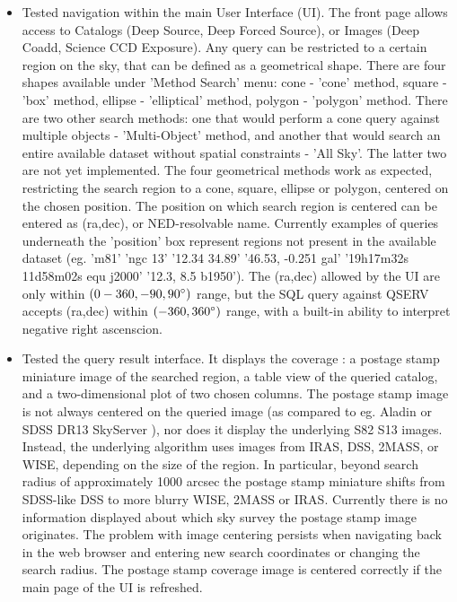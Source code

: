 \documentclass[DM,lsstdraft,toc,usenatbib]{lsstdoc}
\begin{document}
\begin{itemize}
	\item Tested navigation within the main User Interface (UI). The front page allows access to Catalogs (Deep Source, Deep Forced Source), or Images (Deep Coadd, Science CCD Exposure). Any query can be restricted to a certain region on the sky, that can be defined as a geometrical shape. There are four shapes available under  'Method Search' menu:  cone - 'cone' method,  square - 'box' method,  ellipse - 'elliptical' method, polygon - 'polygon' method.  There are two other search methods: one that would perform a cone query against multiple objects - 'Multi-Object' method, and  another  that would search an entire available dataset without spatial constraints  - 'All Sky'. The latter two are not yet implemented. The four geometrical methods work as expected, restricting the search region to a cone, square, ellipse or polygon, centered on the chosen position.  The position on which search region is centered can be entered as (ra,dec), or NED-resolvable name. Currently examples of queries underneath the 'position' box represent regions not present in the available dataset (eg. 'm81' 'ngc 13' '12.34 34.89' '46.53, -0.251 gal'  '19h17m32s 11d58m02s equ j2000' '12.3, 8.5 b1950'). The (ra,dec) allowed by the UI are only within  $(0-360, -90,90 \degree)$ range, but the SQL query against QSERV  accepts (ra,dec) within $(-360,360 \degree)$ range, with a built-in ability to interpret negative right ascenscion.

	\item Tested the query result interface. It displays the coverage : a postage stamp miniature image of the searched region, a table view of the queried catalog, and a two-dimensional plot of two chosen columns. The postage  stamp image is not always centered on the queried image (as compared to eg. Aladin or SDSS DR13 SkyServer ), nor does it display the underlying S82 S13 images. Instead, the underlying algorithm uses images  from IRAS, DSS, 2MASS, or WISE, depending on the size of the region. In particular, beyond search radius of  approximately 1000 arcsec the postage stamp miniature shifts from SDSS-like DSS to more blurry WISE, 2MASS or IRAS.  Currently there is no information displayed about which sky survey the postage stamp image originates. The problem with image centering persists when navigating back in the web browser and entering new search coordinates or changing the search radius. The postage stamp coverage image is centered correctly if the main page of the UI is refreshed. 


\end{itemize}
\end{document}
